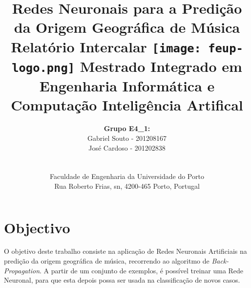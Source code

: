 \documentclass[a4paper]{article}
\begin{document}
\setlength{\textwidth}{16cm}
\setlength{\textheight}{22cm}

\title{\Huge\textbf{Redes Neuronais para a Predição da Origem Geográfica de Música}\linebreak\linebreak\linebreak
\Large\textbf{Relatório Intercalar}\linebreak\linebreak
\linebreak\linebreak
\texttt{[image: feup-logo.png]}\linebreak\linebreak
\linebreak
\Large{Mestrado Integrado em Engenharia Informática e Computação} \linebreak\linebreak
\Large{Inteligência Artifical}\linebreak
}

\author{\textbf{Grupo E4\_1:}\\ Gabriel Souto - 201208167 \\ José Cardoso - 201202838 \\\linebreak\linebreak \\
 \\ Faculdade de Engenharia da Universidade do Porto \\ Rua Roberto Frias, s\/n, 4200-465 Porto, Portugal }
\pagebreak


\maketitle
\thispagestyle{empty}


\newpage

\section{Objectivo}

O objetivo deste trabalho consiste na aplicação de Redes Neuronais Artificiais na predição da origem geográfica de música, recorrendo ao algoritmo de \textit{Back-Propagation}.\linebreak
A partir de um conjunto de exemplos, é possível treinar uma Rede Neuronal, para que esta depois possa ser usada na classificação de novos casos.
\end{document}
